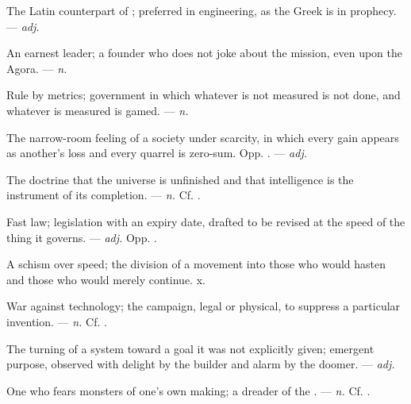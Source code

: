  The Latin counterpart of ; preferred in engineering, as the Greek is in prophecy. ---  \textit{adj.}

 An earnest leader; a founder who does not joke about the mission, even upon the Agora. ---  \textit{n.}

 Rule by metrics; government in which whatever is not measured is not done, and whatever is measured is gamed. ---  \textit{n.}

 The narrow-room feeling of a society under scarcity, in which every gain appears as another's loss and every quarrel is zero-sum. Opp. . ---  \textit{adj.}

 The doctrine that the universe is unfinished and that intelligence is the instrument of its completion. ---  \textit{n.} Cf. .

 Fast law; legislation with an expiry date, drafted to be revised at the speed of the thing it governs. ---  \textit{adj.} Opp. .

 A schism over speed; the division of a movement into those who would hasten and those who would merely continue.   x.

 War against technology; the campaign, legal or physical, to suppress a particular invention. ---  \textit{n.} Cf. .

 The turning of a system toward a goal it was not explicitly given; emergent purpose, observed with delight by the builder and alarm by the doomer. ---  \textit{adj.}

 One who fears monsters of one's own making; a dreader of the . ---  \textit{n.} Cf. .

